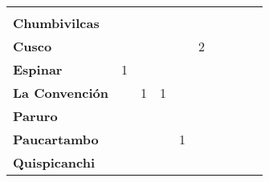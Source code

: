 \begin{tabular}{lccccccccc}
	&\cellcolor[HTML]{FCC46C}					&\cellcolor[HTML]{FCC46C}					&\cellcolor[HTML]{FCC46C}					&\cellcolor[HTML]{FCC46C}					&\cellcolor[HTML]{FCC46C}					&\cellcolor[HTML]{FCC46C}					&\cellcolor[HTML]{FCC46C}					&\cellcolor[HTML]{FCC46C}
	&\cellcolor[HTML]{FCC46C}					\\
	\textbf{Chumbivilcas}                      												
	&\cellcolor[HTML]{FCC46C}
	&\cellcolor[HTML]{FCC46C}					&\cellcolor[HTML]{FCC46C}
	&\cellcolor[HTML]{FCC46C}					&\cellcolor[HTML]{FCC46C}
	&\cellcolor[HTML]{FCC46C}					&\cellcolor[HTML]{FCC46C}
	&\cellcolor[HTML]{FCC46C}					&\cellcolor[HTML]{FCC46C}\\
	\textbf{Cusco}                            								
	&\cellcolor[HTML]{FCC46C}					&\cellcolor[HTML]{FCC46C}
	&\cellcolor[HTML]{FCC46C}					&\cellcolor[HTML]{FCC46C}
	&2											&\cellcolor[HTML]{FCC46C}
	&\cellcolor[HTML]{FCC46C}					&\cellcolor[HTML]{FCC46C}
	&\cellcolor[HTML]{FCC46C}\\
	\textbf{Espinar}       					             									&1											&\cellcolor[HTML]{FCC46C}
	&\cellcolor[HTML]{FCC46C}					&\cellcolor[HTML]{FCC46C}
	&\cellcolor[HTML]{FCC46C}					&\cellcolor[HTML]{FCC46C}
	&\cellcolor[HTML]{FCC46C}					&\cellcolor[HTML]{FCC46C}
	&\cellcolor[HTML]{FCC46C}\\
	\textbf{La Convención}                      					
	&\cellcolor[HTML]{FCC46C}					&1											&1											&\cellcolor[HTML]{FCC46C} 
	&\cellcolor[HTML]{FCC46C}					&\cellcolor[HTML]{FCC46C}
	&\cellcolor[HTML]{FCC46C}					&\cellcolor[HTML]{FCC46C}
	&\cellcolor[HTML]{FCC46C}\\
	\textbf{Paruro}                            					
	&\cellcolor[HTML]{FCC46C}					&\cellcolor[HTML]{FCC46C}					&\cellcolor[HTML]{FCC46C}					&\cellcolor[HTML]{FCC46C}					&\cellcolor[HTML]{FCC46C}					&\cellcolor[HTML]{FCC46C}
	&\cellcolor[HTML]{FCC46C} 					&\cellcolor[HTML]{FCC46C}
	&\cellcolor[HTML]{FCC46C}\\
	\textbf{Paucartambo}               		                       			
	&\cellcolor[HTML]{FCC46C}					&\cellcolor[HTML]{FCC46C}					&\cellcolor[HTML]{FCC46C}					&1							
	&\cellcolor[HTML]{FCC46C}					&\cellcolor[HTML]{FCC46C}
	&\cellcolor[HTML]{FCC46C}					&\cellcolor[HTML]{FCC46C}
	&\cellcolor[HTML]{FCC46C}\\
	\textbf{Quispicanchi}                                         	      					
	&\cellcolor[HTML]{FCC46C}
	&\cellcolor[HTML]{FCC46C} 					&\cellcolor[HTML]{FCC46C}
	&\cellcolor[HTML]{FCC46C}					&\cellcolor[HTML]{FCC46C}
	&\cellcolor[HTML]{FCC46C}					&\cellcolor[HTML]{FCC46C}

\end{tabular}
